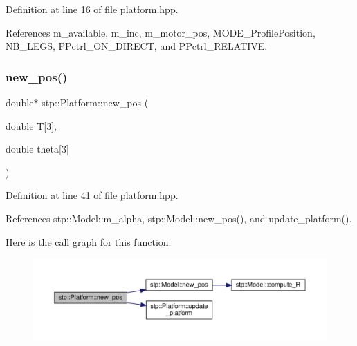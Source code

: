 Definition at line 16 of file platform.\+hpp.



References m\+\_\+available, m\+\_\+inc, m\+\_\+motor\+\_\+pos, M\+O\+D\+E\+\_\+\+Profile\+Position, N\+B\+\_\+\+L\+E\+GS, P\+Pctrl\+\_\+\+O\+N\+\_\+\+D\+I\+R\+E\+CT, and P\+Pctrl\+\_\+\+R\+E\+L\+A\+T\+I\+VE.

\mbox{\label{classstp_1_1_platform_af0ea4b19f21849974bb25b46d9276e84}} 
\subsubsection{\texorpdfstring{new\+\_\+pos()}{new\_pos()}}
{\footnotesize\ttfamily double$\ast$ stp\+::\+Platform\+::new\+\_\+pos (\begin{DoxyParamCaption}\item[{double}]{T\mbox{[}3\mbox{]},  }\item[{double}]{theta\mbox{[}3\mbox{]} }\end{DoxyParamCaption})\hspace{0.3cm}{\ttfamily [inline]}}



Definition at line 41 of file platform.\+hpp.



References stp\+::\+Model\+::m\+\_\+alpha, stp\+::\+Model\+::new\+\_\+pos(), and update\+\_\+platform().

Here is the call graph for this function\+:\nopagebreak
\begin{figure}[H]
\begin{center}
\leavevmode
\includegraphics[width=350pt]{classstp_1_1_platform_af0ea4b19f21849974bb25b46d9276e84_cgraph}
\end{center}
\end{figure}
\mbox{\label{classstp_1_1_platform_ade3a53dd2234f57856b25dab957bae41}} 
